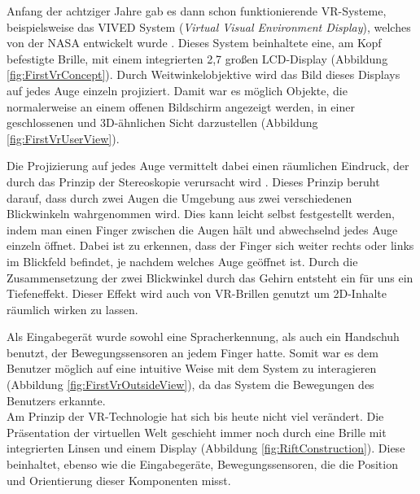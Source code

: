 Anfang der achtziger Jahre gab es dann schon funktionierende VR-Systeme, beispielsweise das VIVED System (\textit{Virtual Visual Environment Display}), welches von der NASA entwickelt wurde \cite{bib:NasaVr}. Dieses System beinhaltete eine, am Kopf befestigte Brille, mit einem integrierten 2,7\dq{} großen LCD-Display (Abbildung \ref{fig:FirstVrConcept}). Durch Weitwinkelobjektive wird das Bild dieses Displays auf jedes Auge einzeln projiziert. Damit war es möglich Objekte, die normalerweise an einem offenen Bildschirm angezeigt werden, in einer geschlossenen und 3D-ähnlichen Sicht darzustellen (Abbildung \ref{fig:FirstVrUserView}). 

Die Projizierung auf jedes Auge vermittelt dabei einen räumlichen Eindruck, der durch das Prinzip der Stereoskopie verursacht wird \cite{bib:Stereoscopy}. Dieses Prinzip beruht darauf, dass durch zwei Augen die Umgebung aus zwei verschiedenen Blickwinkeln wahrgenommen wird. Dies kann leicht selbst festgestellt werden, indem man einen Finger zwischen die Augen hält und abwechselnd jedes Auge einzeln öffnet. Dabei ist zu erkennen, dass der Finger sich weiter rechts oder links im Blickfeld befindet, je nachdem welches Auge geöffnet ist. Durch die Zusammensetzung der zwei Blickwinkel durch das Gehirn entsteht ein für uns ein Tiefeneffekt. Dieser Effekt wird auch von VR-Brillen genutzt um 2D-Inhalte räumlich wirken zu lassen.

Als Eingabegerät wurde sowohl eine Spracherkennung, als auch ein Handschuh benutzt, der Bewegungssensoren an jedem Finger hatte. Somit war es dem Benutzer möglich auf eine intuitive Weise mit dem System zu interagieren (Abbildung \ref{fig:FirstVrOutsideView}), da das System die Bewegungen des Benutzers erkannte.\\

Am Prinzip der VR-Technologie hat sich bis heute nicht viel verändert. Die Präsentation der virtuellen Welt geschieht immer noch durch eine Brille mit integrierten Linsen und einem Display (Abbildung \ref{fig:RiftConstruction}). Diese beinhaltet, ebenso wie die Eingabegeräte, Bewegungssensoren, die die Position und Orientierung dieser Komponenten misst.\\ 

